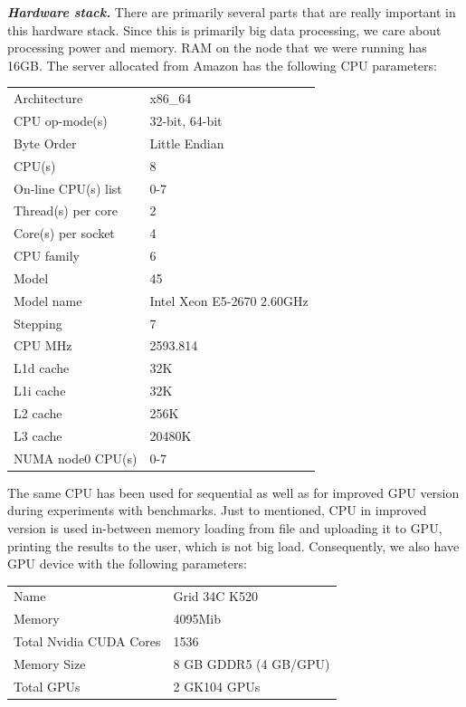 \documentclass[11pt,a4paper]{report}
\begin{document}
\emph{\textbf{Hardware stack.}}
There are primarily several parts that are really important in this hardware stack. Since this is primarily big data processing, we care about processing power and memory. RAM on the node that we were running has 16GB. The server allocated from Amazon has the following CPU parameters:

\begin{center}
  \begin{tabular}{ l  l }
     
Architecture & x86\_64 \\  
CPU op-mode(s) & 32-bit, 64-bit \\  
Byte Order & Little Endian \\  
CPU(s) & 8 \\  
On-line CPU(s) list & 0-7 \\  
Thread(s) per core & 2 \\  
Core(s) per socket & 4 \\  
CPU family & 6 \\  
Model & 45 \\  
Model name & Intel Xeon E5-2670 2.60GHz \\  
Stepping & 7 \\  
CPU MHz & 2593.814 \\  
L1d cache & 32K \\  
L1i cache & 32K \\  
L2 cache & 256K \\  
L3 cache & 20480K \\  
NUMA node0 CPU(s) & 0-7 \\ 
     
  \end{tabular}
\end{center}

The same CPU has been used for sequential as well as for improved GPU version during experiments with benchmarks. Just to mentioned, CPU in improved version is used in-between memory loading from file and uploading it to GPU, printing the results to the user, which is not big load. Consequently, we also have GPU device with the following parameters:

\begin{center}
  \begin{tabular}{ l l }
Name & Grid 34C K520 \\
Memory & 4095Mib \\ 
Total Nvidia CUDA Cores & 1536 \\ 
Memory Size & 8 GB GDDR5 (4 GB/GPU) \\
Total GPUs & 2 GK104 GPUs \\
  \end{tabular}
\end{center}
\end{document}
